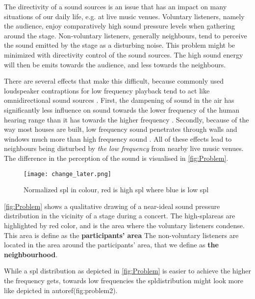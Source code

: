 
The directivity of a sound sources is an issue that has an impact on many situations of our daily life, e.g. at live music venues. Voluntary listeners, namely the audience, enjoy comparatively high sound pressure levels when gathering around the stage. Non-voluntary listeners, generally neighbours, tend to perceive the sound emitted by the stage as a disturbing noise. This problem might be minimized with directivity control of the sound sources. The high sound energy will then be emits towards the audience, and less towards the neighbours. 


There are several effects that make this difficult, because commonly used loudspeaker contraptions for low frequency playback tend to act like omnidirectional sound sources \citep[p. 1391 f.]{crocker98}.  First, the dampening of sound in the air has significantly less influence on sound towards the lower frequency of the human hearing range than it has towards the higher frequency \citep[p. 240]{moeser2009}. Secondly, because of the way most houses are built, low frequency sound penetrates through walls and windows much more than high frequency sound \citep[p. 240 ff.]{moeser2009}. All of these effects lead to neighbours being disturbed by \textit{the low frequency} from nearby live music venues.\\
The difference in the perception of the sound is visualised in \autoref{fig:Problem}.


\begin{figure}[htbp]
	\centering
	\texttt{[image: change\_later.png]}
	\caption{Normalized \gls{spl} in colour, red is high \gls{spl} where blue is low \gls{spl}}
		\label{fig:Problem}
\end{figure}

\autoref{fig:Problem} shows a qualitative drawing of a near-ideal sound pressure distribution in the vicinity of a stage during a concert. The high-\gls{spl}areas are highlighted by red color, and is the area where the voluntary listeners condense. This area is define as the \textbf{participants' area} The non-voluntary listeners are located in the area around the participants' area, that we define as \textbf{the neighbourhood}. 

While a \gls{spl} distribution as depicted in \autoref{fig:Problem} is easier to achieve the higher the frequency gets, towards low frequencies the \gls{spl}distribution might look more like depicted in autoref(fig:problem2).



